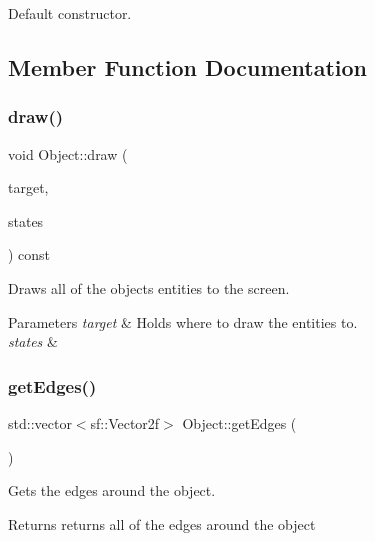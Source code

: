 Default constructor. 



\subsection{Member Function Documentation}
\mbox{\label{class_object_a6c3dc18899c7d428b35b88b1474778d0}} 
\subsubsection{\texorpdfstring{draw()}{draw()}}
{\footnotesize\ttfamily void Object\+::draw (\begin{DoxyParamCaption}\item[{sf\+::\+Render\+Target \&}]{target,  }\item[{sf\+::\+Render\+States}]{states }\end{DoxyParamCaption}) const\hspace{0.3cm}{\ttfamily [protected]}}



Draws all of the object\textquotesingle{}s entities to the screen. 


\begin{DoxyParams}{Parameters}
{\em target} & Holds where to draw the entities to. \\
\hline
{\em states} & \\
\hline
\end{DoxyParams}
\mbox{\label{class_object_afb64c70e24bb001ecb8e6c0364e5a2d7}} 
\subsubsection{\texorpdfstring{get\+Edges()}{getEdges()}}
{\footnotesize\ttfamily std\+::vector$<$sf\+::\+Vector2f$>$ Object\+::get\+Edges (\begin{DoxyParamCaption}{ }\end{DoxyParamCaption})}



Gets the edges around the object. 

\begin{DoxyReturn}{Returns}
returns all of the edges around the object 
\end{DoxyReturn}
\mbox{\label{class_object_a71573d7c00846463d2ef7220bab8f1eb}} 
